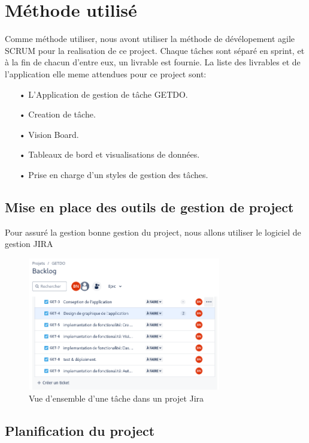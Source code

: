 \documentclass[a4paper,12pt]{report}
\begin{document}
\section{Méthode utilisé}
Comme méthode utiliser, nous avont utiliser la méthode de dévélopement agile SCRUM pour la realisation de ce project. Chaque tâches sont séparé en sprint, et à la fin de chacun d'entre eux, un livrable est fournie. La liste des livrables et de l'application elle meme attendues pour ce project sont:
\begin{itemize}
  \item[•] L'Application de gestion de tâche GETDO.
  \item[•] Creation de tâche.
  \item[•] Vision Board.
  \item[•] Tableaux de bord et visualisations de données.
  \item[•] Prise en charge d'un styles de gestion des tâches.
\end{itemize}

\subsection{Mise en place des outils de gestion de project}
Pour assuré la gestion bonne gestion du project, nous allons utiliser le logiciel de gestion JIRA

\begin{figure}[h!]
    \includegraphics[width=0.75\textwidth]{./images/jira_project_task.png}
    \caption{Vue d'ensemble d'une tâche dans un projet Jira}
    \label{fig:jira_project_task}
\end{figure}

\subsection{Planification du project}
\end{document}
